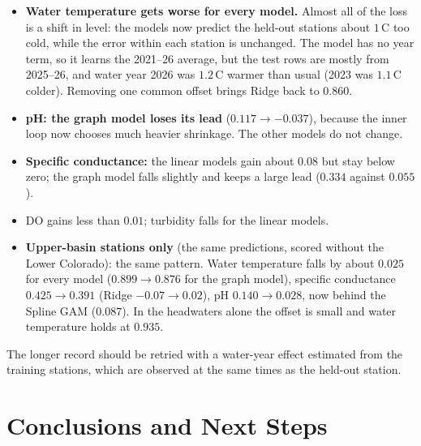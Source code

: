 \documentclass[12pt]{article}
\begin{document}
\begin{itemize}
  \item \textbf{Water temperature gets worse for every model.} Almost all of the loss is a shift in level:
        the models now predict the held-out stations about $1$\,\textdegree C too cold, while the
        error within each station is unchanged. The model has no year term, so it learns the
        2021--26 average, but the test rows are mostly from 2025--26, and water year 2026 was
        $1.2$\,\textdegree C warmer than usual (2023 was $1.1$\,\textdegree C colder). Removing one
        common offset brings Ridge back to $0.860$.
  \item \textbf{pH: the graph model loses its lead} ($0.117\to-0.037$), because the inner loop now
        chooses much heavier shrinkage. The other models do not change.
  \item \textbf{Specific conductance:} the linear models gain about $0.08$ but stay below zero; the
        graph model falls slightly and keeps a large lead ($0.334$ against $0.055$).
  \item DO gains less than $0.01$; turbidity falls for the linear models.
  \item \textbf{Upper-basin stations only} (the same predictions, scored without the Lower
        Colorado): the same pattern. Water temperature falls by about $0.025$ for every model
        ($0.899\to0.876$ for the graph model), specific conductance $0.425\to0.391$ (Ridge
        $-0.07\to0.02$), pH $0.140\to0.028$, now behind the Spline GAM ($0.087$). In the
        headwaters alone the offset is small and water temperature holds at $0.935$.
\end{itemize}
The longer record should be retried with a water-year effect estimated from the training stations,
which are observed at the same times as the held-out station.

\section{Conclusions and Next Steps}
\end{document}
